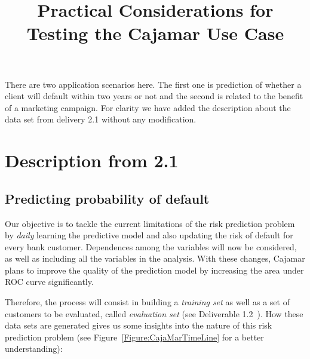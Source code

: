 \documentclass{article}
\title{Practical Considerations for Testing the Cajamar Use Case}
\date{}
\theoremstyle{theorem}
\theoremstyle{definition}
\begin{document}
\maketitle

There are two application scenarios here.  The first one is prediction of whether a client will default within two years or not and the second is related to the benefit of a marketing campaign. For clarity we have added the description about the data set from delivery 2.1 without any modification.

\section{Description from 2.1}

\subsection{Predicting probability of default} \label{SubSection:Predicting}

Our objective is to tackle the current limitations of the risk prediction problem by \textit{daily} learning the predictive model and also updating the risk of default for every bank customer. Dependences among the variables will now be considered, as well as including all the variables in the analysis. With these changes, Cajamar plans to improve the quality of the prediction model by increasing the area under ROC curve significantly.


Therefore, the process will consist in building a \textit{training set} as well as a set of customers to be evaluated, called \textit{evaluation set} (see Deliverable 1.2~\cite{Fer14b}). How these data sets are generated gives us some insights into the nature of this risk prediction problem (see Figure~\ref{Figure:CajaMarTimeLine} for a better understanding):

\end{document}
